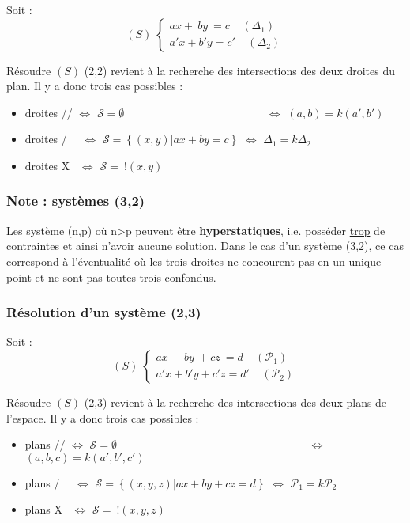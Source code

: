 \documentclass{report}
\newcommand{\Sys}{(S)}
\begin{document}
      Soit : 
      \[(S) \; \begin{cases}
        ax+~by~=c ~~~~~ (\Delta_1)\\
        a'x+b'y=c' ~~~~~ (\Delta_2)
      \end{cases}\]

      Résoudre $\Sys$ (2,2) revient à la recherche des intersections des deux droites du plan. Il y a donc trois cas possibles :
      \begin{itemize}
        \item droites // $\iff$ $\mathcal{S} = \emptyset$ ~~~~~~~~~~~~~~~~~~~~~~~~~$\iff$ $(a,b) = k(a',b')$
        \item droites /~~ $\iff$ $\mathcal{S} = \left\{(x,y) | ax+by=c\right\}$ $\iff$ $\Delta_1 = k\Delta_2$
        \item droites X ~$\iff$ $\mathcal{S} = ~!(x,y)$%
      \end{itemize}

    \subsubsection{Note : systèmes (3,2)}

      Les système (n,p) où n>p peuvent être \textbf{hyperstatiques}, i.e. posséder \underline{trop} de contraintes et ainsi n'avoir aucune solution. Dans le cas d'un système (3,2), ce cas correspond à l'éventualité où les trois droites ne concourent pas en un unique point et ne sont pas toutes trois confondus.


    \subsubsection{Résolution d'un système (2,3)}

      Soit : 
      \[(S) \; \begin{cases}
        ax+~by~+cz~=d ~~~~~ (\mathcal{P}_1)\\
        a'x+b'y+c'z=d' ~~~~~ (\mathcal{P}_2)
      \end{cases}\]

      Résoudre $\Sys$ (2,3) revient à la recherche des intersections des deux plans de l'espace. Il y a donc trois cas possibles :
      \begin{itemize}
        \item plans // $\iff$ $\mathcal{S} = \emptyset$ ~~~~~~~~~~~~~~~~~~~~~~~~~~~~~~~~~~$\iff$ $(a,b,c) = k(a',b',c')$
        \item plans /~~ $\iff$ $\mathcal{S} = \left\{(x,y,z) | ax+by+cz=d\right\}$ $\iff$ $\mathcal{P}_1 = k\mathcal{P}_2$
        \item plans X ~$\iff$ $\mathcal{S} = ~!(x,y,z)$
      \end{itemize}
\end{document}
